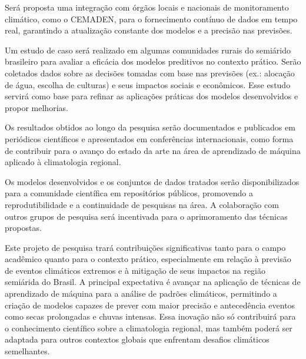 \documentclass{projetodepesquisa} %
\begin{document}
	\label{sec:integracao_orgaos_monitoramento}
	Será proposta uma integração com órgãos locais e nacionais de monitoramento climático, como o CEMADEN, para o fornecimento contínuo de dados em tempo real, garantindo a atualização constante dos modelos e a precisão nas previsões.
	
	\label{sec:estudo_caso}
	Um estudo de caso será realizado em algumas comunidades rurais do semiárido brasileiro para avaliar a eficácia dos modelos preditivos no contexto prático. Serão coletados dados sobre as decisões tomadas com base nas previsões (ex.: alocação de água, escolha de culturas) e seus impactos sociais e econômicos. Esse estudo servirá como base para refinar as aplicações práticas dos modelos desenvolvidos e propor melhorias.
	
	\label{sec:divulgacao_cientifica}
	\label{sec:publicacao_resultados}
	Os resultados obtidos ao longo da pesquisa serão documentados e publicados em periódicos científicos e apresentados em conferências internacionais, como forma de contribuir para o avanço do estado da arte na área de aprendizado de máquina aplicado à climatologia regional.
	
	\label{sec:disponibilizacao_modelos_dados}
	Os modelos desenvolvidos e os conjuntos de dados tratados serão disponibilizados para a comunidade científica em repositórios públicos, promovendo a reprodutibilidade e a continuidade de pesquisas na área. A colaboração com outros grupos de pesquisa será incentivada para o aprimoramento das técnicas propostas.
	
	\label{sec:contribuicao_esperada}
	
	Este projeto de pesquisa trará contribuições significativas tanto para o campo acadêmico quanto para o contexto prático, especialmente em relação à previsão de eventos climáticos extremos e à mitigação de seus impactos na região semiárida do Brasil. A principal expectativa é avançar na aplicação de técnicas de aprendizado de máquina para a análise de padrões climáticos, permitindo a criação de modelos capazes de prever com maior precisão e antecedência eventos como secas prolongadas e chuvas intensas. Essa inovação não só contribuirá para o conhecimento científico sobre a climatologia regional, mas também poderá ser adaptada para outros contextos globais que enfrentam desafios climáticos semelhantes.
	
\end{document}
